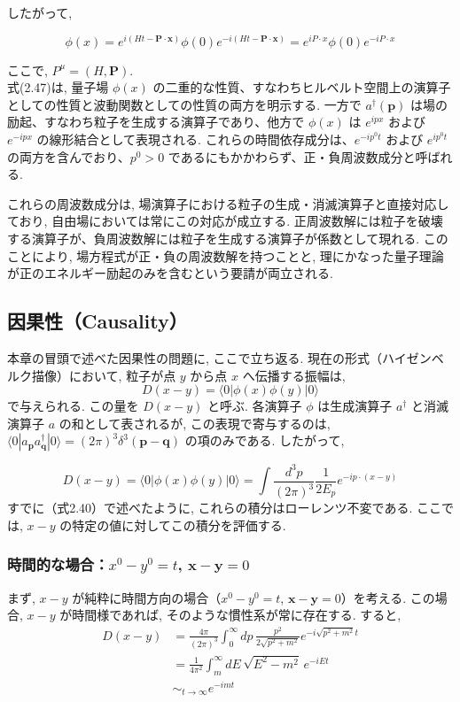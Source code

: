 \documentclass[a4paper,12pt]{article}
\begin{document}
したがって,

\begin{equation*}
\phi(x) = e^{i(Ht - \mathbf{P} \cdot \mathbf{x})} \phi(0) e^{-i(Ht - \mathbf{P} \cdot \mathbf{x})} = e^{i P \cdot x} \phi(0) e^{-i P \cdot x} \tag{2.49}
\end{equation*}

ここで, $P^\mu = (H, \mathbf{P})$.\\
式(2.47)は, 量子場 $\phi(x)$ の二重的な性質、すなわちヒルベルト空間上の演算子としての性質と波動関数としての性質の両方を明示する. 一方で $a^\dagger(\mathbf{p})$ は場の励起、すなわち粒子を生成する演算子であり、他方で $\phi(x)$ は $e^{ipx}$ および $e^{-ipx}$ の線形結合として表現される. これらの時間依存成分は、$e^{-i p^0 t}$ および $e^{i p^0 t}$ の両方を含んでおり、$p^0 > 0$ であるにもかかわらず、正・負周波数成分と呼ばれる.\par
これらの周波数成分は, 場演算子における粒子の生成・消滅演算子と直接対応しており, 自由場においては常にこの対応が成立する. 正周波数解には粒子を破壊する演算子が、負周波数解には粒子を生成する演算子が係数として現れる. このことにより, 場方程式が正・負の周波数解を持つことと, 理にかなった量子理論が正のエネルギー励起のみを含むという要請が両立される.

\subsection*{因果性（Causality）}

本章の冒頭で述べた因果性の問題に, ここで立ち返る. 現在の形式（ハイゼンベルク描像）において, 粒子が点 $y$ から点 $x$ へ伝播する振幅は,
\begin{equation*}
D(x - y) = \langle 0 | \phi(x) \phi(y) | 0 \rangle
\end{equation*}
で与えられる. この量を $D(x - y)$ と呼ぶ. 各演算子 $\phi$ は生成演算子 $a^\dagger$ と消滅演算子 $a$ の和として表されるが, この表現で寄与するのは, $\langle 0 | a_{\mathbf{p}} a^\dagger_{\mathbf{q}} | 0 \rangle = (2\pi)^3 \delta^3(\mathbf{p} - \mathbf{q})$ の項のみである. したがって,

\begin{equation*}
D(x - y) = \langle 0 | \phi(x) \phi(y) | 0 \rangle = \int \frac{d^3 p}{(2\pi)^3} \frac{1}{2E_p} e^{-ip \cdot (x - y)} \tag{2.50}
\end{equation*}
すでに（式2.40）で述べたように, これらの積分はローレンツ不変である. ここでは, $x - y$ の特定の値に対してこの積分を評価する.
\subsubsection*{時間的な場合：$x^0 - y^0 = t$, $\mathbf{x} - \mathbf{y} = 0$}
まず, $x - y$ が純粋に時間方向の場合（$x^0 - y^0 = t$, $\mathbf{x} - \mathbf{y} = 0$）を考える. この場合, $x - y$ が時間様であれば, そのような慣性系が常に存在する. すると,
\begin{align*}
D(x - y) &= \frac{4\pi}{(2\pi)^3} \int_0^\infty dp \, \frac{p^2}{2\sqrt{p^2 + m^2}} e^{-i \sqrt{p^2 + m^2} t} \\
&= \frac{1}{4\pi^2} \int_m^\infty dE \, \sqrt{E^2 - m^2} \, e^{-i E t} \tag{2.51} \\
&\sim_{t \to \infty} e^{-imt}
\end{align*}
\end{document}
